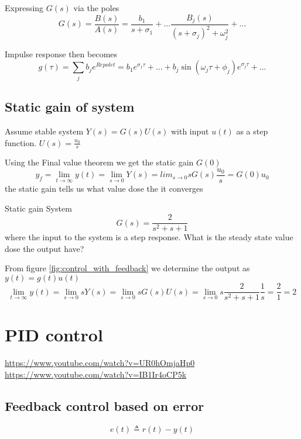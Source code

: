 Expressing $G(s)$ via the poles
\begin{equation*}
    G(s)=\frac{B(s)}{A(s)}= \frac{b_1}{s+\sigma_1} + \ldots \frac{B_j(s)}{(s+\sigma_j)^2+\omega_j^2} + \ldots
\end{equation*}

Impulse response then becomes
\begin{equation*}
   g(\tau) = \sum_j b_je^{Re{pole}t} = b_1e^{\sigma_1\tau}+\ldots+b_j\sin(\omega_j\tau+\phi_j)e^{\sigma_j\tau}+\ldots
\end{equation*}

\subsection{Static gain of system}
Assume stable system $Y(s)=G(s)U(s)$ with input $u(t)$ as a step function. $U(s)=\frac{u_0}{s}$

Using the Final value theorem we get the static gain $G(0)$
\begin{equation*}
    y_f  = \lim_{t\to\infty}y(t) = \lim_{s\to 0}Y(s) = lim_{s\to 0}sG(s)\frac{u_0}{s} = G(0)u_0
\end{equation*}
the static gain tells us what value dose the it converges

\begin{exampleblock}{Static gain}
   System
   \begin{equation*}
       G(s)=\frac{2}{s^2 + s + 1}
   \end{equation*}
   where the input to the system is a step response. What is the steady state value dose
   the output have?

   From figure \ref{fig:control_with_feedback} we determine the output as $y(t)=g(t)u(t)$
   \begin{equation*}
        \lim_{t\to\infty}y(t) = \lim_{s\to0} sY(s) = \lim_{s\to0} sG(s)U(s) = \lim_{s\to0} s\frac{2}{s^2 + s + 1}\frac{1}{s} = \frac{2}{1} = 2
   \end{equation*}
\end{exampleblock}

\section{PID control}
\url{https://www.youtube.com/watch?v=UR0hOmjaHp0} \newline
\url{https://www.youtube.com/watch?v=IB1Ir4oCP5k}
\subsection{Feedback control based on error}
\begin{equation*}
    e(t) \triangleq r(t)-y(t)
\end{equation*}

